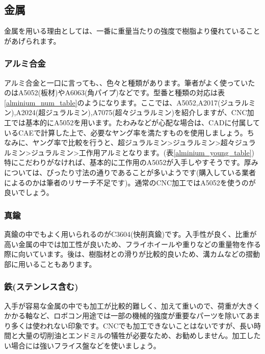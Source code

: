 \documentclass[b5paper, 9pt, twocolumn, titlepage,openany]{jsbook}%
\begin{document}
\subsection{金属}

金属を用いる理由としては、一番に重量当たりの強度で樹脂より優れていることがあげられます。\\
\subsubsection{アルミ合金}

アルミ合金と一口に言っても、、色々と種類があります。筆者がよく使っていたのはA5052(板材)やA6063(角パイプ)などです。型番と種類の対応は表\ref{alminium_num_table}のようになります。ここでは、A5052,A2017(ジュラルミン),A2024(超ジュラルミン),A7075(超々ジュラルミン)を紹介しますが、CNC加工では基本的にA5052を用います。たわみなどが心配な場合は、CADに付属しているCAEで計算した上で、必要なヤング率を満たすものを使用しましょう。ちなみに、ヤング率で比較を行うと、超ジュラルミン>ジュラルミン>超々ジュラルミン>ジュラルミン>工作用アルミとなります。(表\ref{alminium_young_table})特にこだわりがなければ、基本的に工作用のA5052が入手しやすそうです。厚みについては、ぴったり寸法の通りであることが多いようです(購入している業者によるのかは筆者のリサーチ不足です)。通常のCNC加工ではA5052を使うのが良いでしょう。\cite{alminium_properties}\\
\subsubsection{真鍮}

真鍮の中でもよく用いられるのがC3604(快削真鍮)です。入手性が良く、比重が高い金属の中では加工性が良いため、フライホイールや重りなどの重量物を作る際に向いています。後は、樹脂材との滑りが比較的良いため、溝カムなどの摺動部に用いることもあります。\\
\subsubsection{鉄(ステンレス含む)}

入手が容易な金属の中でも加工が比較的難しく、加えて重いので、荷重が大きくかかる軸など、ロボコン用途では一部の機械的強度が重要なパーツを除いてあまり多くは使われない印象です。CNCでも加工できないことはないですが、長い時間と大量の切削油とエンドミルの犠牲が必要なため、お勧めしません。加工したい場合には強いフライス盤などを使いましょう。\\
\end{document}
